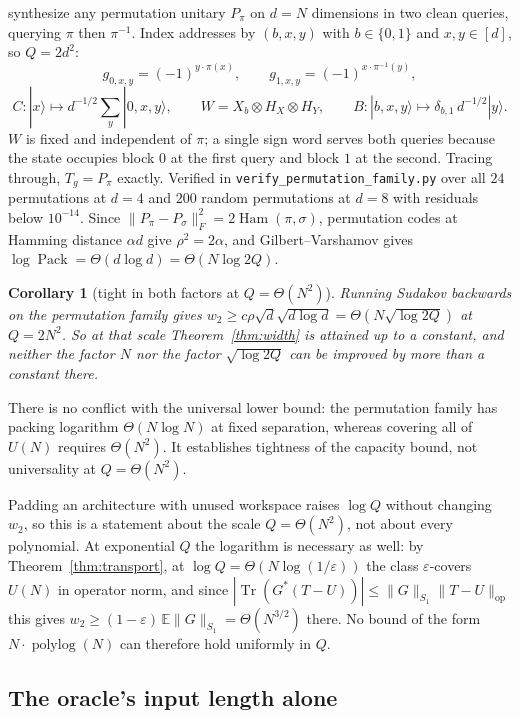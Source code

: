 \documentclass[11pt,a4paper]{article}
\theoremstyle{plain}
\newtheorem{corollary}[theorem]{Corollary}
\theoremstyle{definition}
\theoremstyle{remark}
\DeclareMathOperator{\Tr}{Tr}
\DeclareMathOperator{\Pack}{Pack}
\DeclareMathOperator{\Ham}{Ham}
\DeclareMathOperator{\polylog}{polylog}
\DeclareMathOperator{\op}{op}
\newcommand{\E}{\mathbb E}
\newcommand{\Fro}[1]{\|#1\|_F}
\begin{document}
\cite{DLM26} synthesize any permutation unitary $P_\pi$ on $d=N$ dimensions in two clean
queries, querying $\pi$ then $\pi^{-1}$. Index addresses by $(b,x,y)$ with $b\in\{0,1\}$ and
$x,y\in[d]$, so $Q=2d^2$:
\[
g_{0,x,y}=(-1)^{y\cdot\pi(x)},\qquad g_{1,x,y}=(-1)^{x\cdot\pi^{-1}(y)},
\]
\[
C:|x\rangle\mapsto d^{-1/2}\sum_y|0,x,y\rangle,\qquad W=X_b\otimes H_X\otimes H_Y,\qquad
B:|b,x,y\rangle\mapsto\delta_{b,1}\,d^{-1/2}|y\rangle.
\]
$W$ is fixed and independent of $\pi$; a single sign word serves both queries because the
state occupies block $0$ at the first query and block $1$ at the second. Tracing through,
$T_g=P_\pi$ exactly. Verified in \texttt{verify\_permutation\_family.py} over all $24$
permutations at $d=4$ and $200$ random permutations at $d=8$ with residuals below $10^{-14}$.
Since $\Fro{P_\pi-P_\sigma}^2=2\Ham(\pi,\sigma)$, permutation codes at Hamming distance
$\alpha d$ give $\rho^2=2\alpha$, and Gilbert--Varshamov gives
$\log\Pack=\Theta(d\log d)=\Theta(N\log2Q)$.

\begin{corollary}[tight in both factors at $Q=\Theta(N^2)$]\label{cor:tight}
Running Sudakov backwards on the permutation family gives
$w_2\ge c\rho\sqrt d\sqrt{d\log d}=\Theta(N\sqrt{\log2Q})$ at $Q=2N^2$. So at that scale
Theorem~\ref{thm:width} is attained up to a constant, and neither the factor $N$ nor the
factor $\sqrt{\log2Q}$ can be improved by more than a constant there.
\end{corollary}

There is no conflict with the universal lower bound: the permutation family has
packing logarithm $\Theta(N\log N)$ at fixed separation, whereas covering all
of $U(N)$ requires $\Theta(N^2)$. It establishes tightness of the capacity bound,
not universality at $Q=\Theta(N^2)$.

Padding an architecture with unused workspace raises $\log Q$ without changing $w_2$, so
this is a statement about the scale $Q=\Theta(N^2)$, not about every polynomial. At
exponential $Q$ the logarithm is necessary as well: by Theorem~\ref{thm:transport}, at
$\log Q=\Theta(N\log(1/\varepsilon))$ the class $\varepsilon$-covers $U(N)$ in operator norm,
and since $|\Tr(G^{*}(T-U))|\le\|G\|_{S_1}\|T-U\|_{\op}$ this gives
$w_2\ge(1-\varepsilon)\,\E\|G\|_{S_1}=\Theta(N^{3/2})$ there. No bound of the form
$N\cdot\polylog(N)$ can therefore hold uniformly in $Q$.

\subsection{The oracle's input length alone}\label{sec:address}
\end{document}
